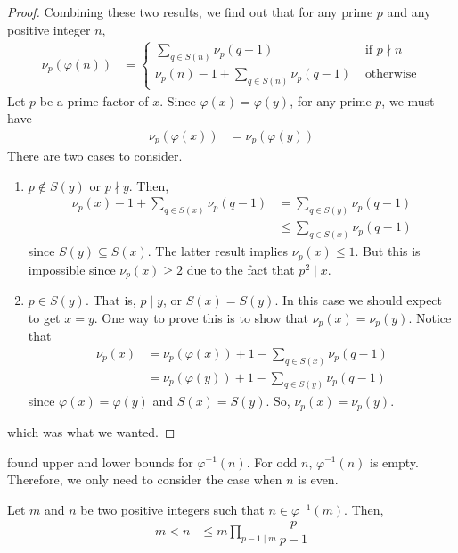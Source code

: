\documentclass[main.tex]{subfile}
\begin{document}
\begin{proof}
			Combining these two results, we find out that for any prime $p$ and any positive integer $n$,
				\begin{align*}
					\nu_{p}(\varphi(n)) & =
						\begin{cases}
							\sum_{q\in S(n)}\nu_{p}(q-1)&\text{ if }p\nmid n\\
							\nu_{p}(n)-1+\sum_{q\in S(n)}\nu_{p}(q-1)&\text{ otherwise}
						\end{cases}
				\end{align*}
			Let $p$ be a prime factor of $x$. Since $\varphi(x)=\varphi(y)$, for any prime $p$, we must have
				\begin{align*}
					\nu_{p}(\varphi(x)) & = \nu_{p}(\varphi(y))
				\end{align*}
			There are two cases to consider.
				\begin{enumerate}[1.]
					\item $p\notin S(y)$ or $p\nmid y$. Then,
							\begin{align*}
								\nu_{p}(x)-1+\sum_{q\in S(x)}\nu_{p}(q-1) & = \sum_{q\in S(y)}\nu_{p}(q-1)\\
																	  & \leq\sum_{q\in S(x)}\nu_{p}(q-1)
							\end{align*}
						since $S(y)\subseteq S(x)$. The latter result implies $\nu_{p}(x) \leq 1$. But this is impossible since $\nu_{p}(x)\geq2$ due to the fact that $p^2\mid x$.
					\item $p\in S(y)$. That is, $p\mid y$, or $S(x)=S(y)$. In this case we should expect to get $x=y$. One way to prove this is to show that $\nu_{p}(x)=\nu_{p}(y)$. Notice that
						\begin{align*}
							\nu_{p}(x) & = \nu_{p}(\varphi(x))+1-\sum_{q\in S(x)} \nu_{p}(q-1)\\
									 & = \nu_{p}(\varphi(y))+1-\sum_{q\in S(y)} \nu_{p}(q-1)
						\end{align*}
					since $\varphi(x)=\varphi(y)$ and $S(x)=S(y)$. So, $\nu_{p}(x)=\nu_{p}(y)$.
				\end{enumerate}
			which was what we wanted.
		\end{proof}

	\textcite{gupta_1981} found upper and lower bounds for $\varphi^{-1}(n)$. For odd $n$, $\varphi^{-1}(n)$ is empty. Therefore, we only need to consider the case when $n$ is even.
		\begin{theorem}[Gupta]\label{thm:gupta}
			Let $m$ and $n$ be two positive integers such that $n\in\varphi^{-1}(m)$. Then,
				\begin{align*}
					m < n & \leq m\prod_{p-1\mid m}\dfrac{p}{p-1}
				\end{align*}
		\end{theorem}
\end{document}

